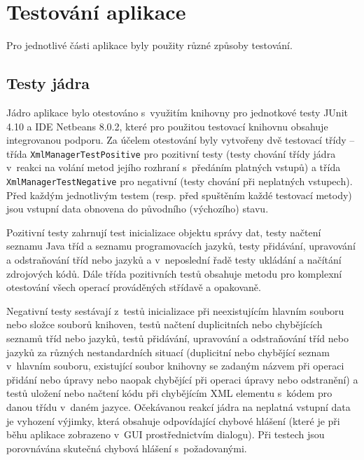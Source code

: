 \documentclass[czech,BP]{thesiskiv}
\begin{document}
\section{Testování aplikace}
Pro jednotlivé části aplikace byly použity různé způsoby testování.

\subsection{Testy jádra}
Jádro aplikace bylo otestováno s~využitím knihovny pro jednotkové testy JUnit 4.10 a IDE Netbeans 8.0.2, které pro použitou testovací knihovnu obsahuje integrovanou podporu. Za účelem otestování byly vytvořeny dvě testovací třídy -- třída \texttt{XmlManagerTestPositive} pro pozitivní testy (testy chování třídy jádra v~reakci na volání metod jejího rozhraní s~předáním platných vstupů) a třída \texttt{XmlManagerTestNegative} pro negativní (testy chování při neplatných vstupech). Před každým jednotlivým testem (resp. před spuštěním každé testovací metody) jsou vstupní data obnovena do původního (výchozího) stavu.\par
Pozitivní testy zahrnují test inicializace objektu správy dat, testy načtení seznamu Java tříd a seznamu programovacích jazyků, testy přidávání, upravování a odstraňování tříd nebo jazyků a v~neposlední řadě testy ukládání a načítání zdrojových kódů. Dále třída pozitivních testů obsahuje metodu pro komplexní otestování všech operací prováděných střídavě a opakovaně.\par
Negativní testy sestávají z~testů inicializace při neexistujícím hlavním souboru nebo složce souborů knihoven, testů načtení duplicitních nebo chybějících seznamů tříd nebo jazyků, testů přidávání, upravování a odstraňování tříd nebo jazyků za různých nestandardních situací (duplicitní nebo chybějící seznam v~hlavním souboru, existující soubor knihovny se zadaným názvem při operaci přidání nebo úpravy nebo naopak chybějící při operaci úpravy nebo odstranění) a testů uložení nebo načtení kódu při chybějícím XML elementu s~kódem pro danou třídu v~daném jazyce. Očekávanou reakcí jádra na neplatná vstupní data je vyhození výjimky, která obsahuje odpovídající chybové hlášení (které je při běhu aplikace zobrazeno v~GUI prostřednictvím dialogu). Při testech jsou porovnávána skutečná chybová hlášení s~požadovanými.
\end{document}
